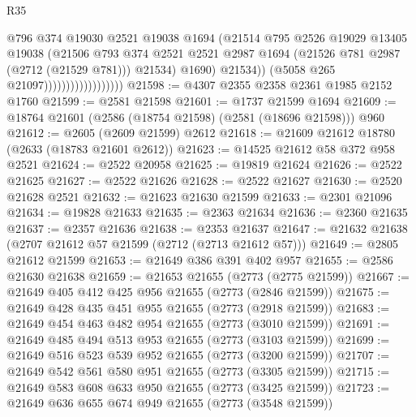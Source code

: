 \begin{lexlean}{R35}
\begin{coremodule}
                                          @796
                                          @374
                                          @19030
                                          @2521
                                          @19038
                                          @1694
                                          (@21514
                                            @795
                                            @2526
                                            @19029
                                            @13405
                                            @19038
                                            (@21506
                                              @793
                                              @374
                                              @2521
                                              @2521
                                              @2987
                                              @1694
                                              (@21526 @781 @2987 (@2712 (@21529 @781)))
                                              @21534)
                                            @1690)
                                          @21534))
                                      (@5058 @265 @21097))))))))))))))))))
@21598 := @4307 @2355 @2358 @2361 @1985 @2152 @1760
@21599 := @2581 @21598
@21601 := @1737 @21599 @1694
@21609 := @18764 @21601 (@2586 (@18754 @21598) (@2581 (@18696 @21598))) @960
@21612 := @2605 (@2609 @21599) @2612
@21618 := @21609 @21612 @18780 (@2633 (@18783 @21601 @2612))
@21623 := @14525 @21612 @58 @372 @958 @2521
@21624 := @2522 @20958
@21625 := @19819 @21624
@21626 := @2522 @21625
@21627 := @2522 @21626
@21628 := @2522 @21627
@21630 := @2520 @21628 @2521
@21632 := @21623 @21630 @21599
@21633 := @2301 @21096
@21634 := @19828 @21633
@21635 := @2363 @21634
@21636 := @2360 @21635
@21637 := @2357 @21636
@21638 := @2353 @21637
@21647 := @21632 @21638 (@2707 @21612 @57 @21599 (@2712 (@2713 @21612 @57)))
@21649 := @2805 @21612 @21599
@21653 := @21649 @386 @391 @402 @957
@21655 := @2586 @21630 @21638
@21659 := @21653 @21655 (@2773 (@2775 @21599))
@21667 := @21649 @405 @412 @425 @956 @21655 (@2773 (@2846 @21599))
@21675 := @21649 @428 @435 @451 @955 @21655 (@2773 (@2918 @21599))
@21683 := @21649 @454 @463 @482 @954 @21655 (@2773 (@3010 @21599))
@21691 := @21649 @485 @494 @513 @953 @21655 (@2773 (@3103 @21599))
@21699 := @21649 @516 @523 @539 @952 @21655 (@2773 (@3200 @21599))
@21707 := @21649 @542 @561 @580 @951 @21655 (@2773 (@3305 @21599))
@21715 := @21649 @583 @608 @633 @950 @21655 (@2773 (@3425 @21599))
@21723 := @21649 @636 @655 @674 @949 @21655 (@2773 (@3548 @21599))

\end{coremodule}
\end{lexlean}
